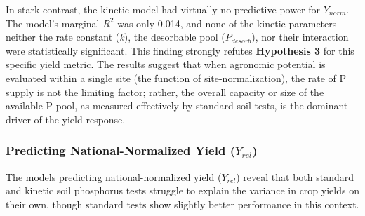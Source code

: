 \documentclass[
  a4paper,
]{article}
\begin{document}
In stark contrast, the kinetic model had virtually no predictive power
for \(Y_{norm}\). The model's marginal \(R^2\) was only 0.014, and none
of the kinetic parameters---neither the rate constant (\emph{k}), the
desorbable pool (\(P_{desorb}\)), nor their interaction were
statistically significant. This finding strongly refutes
\textbf{Hypothesis 3} for this specific yield metric. The results
suggest that when agronomic potential is evaluated within a single site
(the function of site-normalization), the rate of P supply is not the
limiting factor; rather, the overall capacity or size of the available P
pool, as measured effectively by standard soil tests, is the dominant
driver of the yield response.

\subsubsection{\texorpdfstring{Predicting National-Normalized Yield
(\(Y_{rel}\))}{Predicting National-Normalized Yield (Y\_\{rel\})}}\label{predicting-national-normalized-yield-y_rel}

The models predicting national-normalized yield (\(Y_{rel}\)) reveal
that both standard and kinetic soil phosphorus tests struggle to explain
the variance in crop yields on their own, though standard tests show
slightly better performance in this context.
\end{document}
